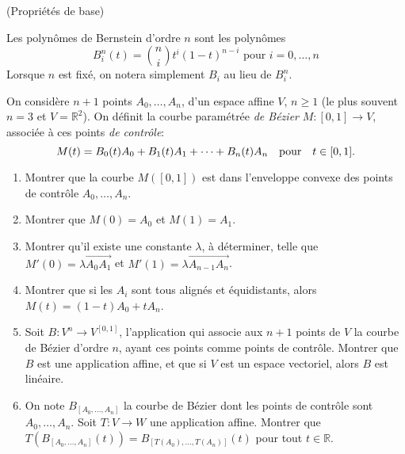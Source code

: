 \documentclass[a4paper,12pt,reqno]{amsart}
\begin{document}


\begin{exo}\label{exo:base} (Propriétés de base)

  Les polynômes de Bernstein d'ordre $n$ sont les polynômes
  $$
    B_{i}^{n}(t) =\binom{n}{i}t^{i}(1-t)^{n-i} \text{ pour } i=0,\ldots,n
  $$
  Lorsque $n$ est fixé, on notera simplement $B_{i}$ au lieu de $B_{i}^{n}$.

  On considère $n + 1$ points $A_{0},\ldots,A_{n}$, d'un espace affine $V$, $n \geq 1$ (le plus souvent $n = 3$ et $V=\mathbb{R}^{2}$).
  On définit la courbe paramétrée \emph{de Bézier} $M:[0,1] \rightarrow V$, associée à ces points \emph{de contrôle}:
  $$
    M(t) = B_{0}(t) A_{0} + B_{1}(t) A_{1} + \cdots + B_{n}(t) A_{n}
      \text{\quad pour\quad} t \in [0,1].
  $$
  \begin{enumerate}
    \item Montrer que la courbe $M([0,1])$ est dans l'enveloppe convexe des points de contrôle $A_{0},\ldots,A_{n}$.

    \item Montrer que $M(0)=A_{0}$ et $M(1)=A_{1}$.

    \item\label{exo:base:bords} Montrer qu'il existe une constante $\lambda$, à déterminer, telle que $M'(0)=\lambda\overrightarrow{A_{0}A_{1}}$ et $M'(1)=\lambda\overrightarrow{A_{n-1}A_{n}}$.

    \item\label{exo:base:allignes} Montrer que si les $A_{i}$ sont tous alignés et équidistants, alors $M(t) = (1-t) A_{0} + t A_{n}$.

    \item\label{exo:base:B} Soit $B:V^{n} \longrightarrow V^{[0,1]}$, l'application qui associe aux $n+1$ points de $V$ la courbe de Bézier d'ordre $n$, ayant ces points comme points de contrôle.
    Montrer que $B$ est une application affine, et que si $V$ est un espace vectoriel, alors $B$ est linéaire.

    \item On note $B_{[A_{0},\ldots,A_{n}]}$ la courbe de Bézier dont les points de contrôle sont $A_{0},\ldots,A_{n}$. Soit $T:V \rightarrow W$ une application affine. Montrer que $T(B_{[A_{0},\ldots,A_{n}]}(t)) = B_{[T(A_{0}),\ldots,T(A_{n})]}(t)$ pour tout $t \in \mathbb{R}$.
  \end{enumerate}
\end{exo}
\end{document}
